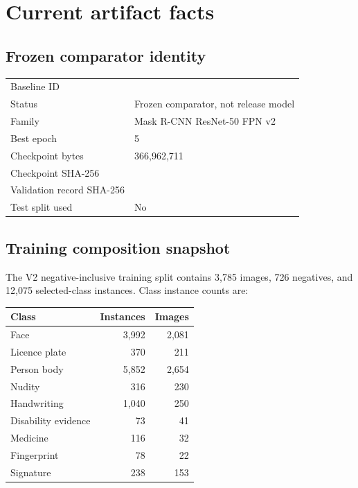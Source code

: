 \chapter{Current artifact facts}

\section{Frozen comparator identity}

\begin{tabularx}{\textwidth}{@{}L{45mm}Y@{}}
\toprule
Baseline ID &  \\
Status & Frozen comparator, not release model \\
Family & Mask R-CNN ResNet-50 FPN v2 \\
Best epoch & 5 \\
Checkpoint bytes & 366,962,711 \\
Checkpoint SHA-256 &  \\
Validation record SHA-256 &  \\
Test split used & No \\
\bottomrule
\end{tabularx}

\section{Training composition snapshot}

The V2 negative-inclusive training split contains 3,785 images, 726 negatives, and 12,075 selected-class instances. Class instance counts are:

\begin{tabular}{@{}lrr@{}}
\toprule
\textbf{Class} & \textbf{Instances} & \textbf{Images} \\
\midrule
Face & 3,992 & 2,081 \\
Licence plate & 370 & 211 \\
Person body & 5,852 & 2,654 \\
Nudity & 316 & 230 \\
Handwriting & 1,040 & 250 \\
Disability evidence & 73 & 41 \\
Medicine & 116 & 32 \\
Fingerprint & 78 & 22 \\
Signature & 238 & 153 \\
\bottomrule
\end{tabular}

